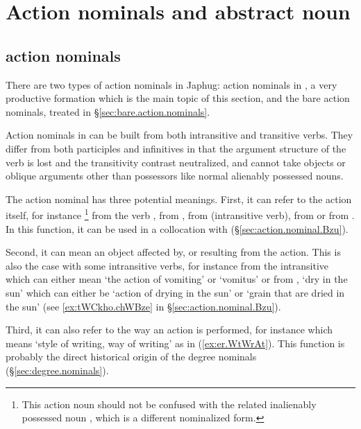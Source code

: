 \section{Action nominals and abstract noun} \label{sec:action.nominals}

\subsection{ action nominals} \label{sec:tW.action.nominal}
There are two types of action nominals in Japhug: action nominals in , a very productive formation which is the main topic of this section, and the bare action nominals, treated in §\ref{sec:bare.action.nominals}.

Action nominals in  can be built from both intransitive and transitive verbs. They differ from both participles and infinitives in that the argument structure of the verb is lost and the transitivity contrast neutralized, and cannot take objects or oblique arguments other than possessors like normal alienably possessed nouns.


The action nominal has three potential meanings.  First, it can refer to the action itself, for instance \footnote{This action noun should not be confused with the related inalienably possessed noun , which is a different nominalized form. } from the verb ,  from ,  from  (intransitive verb),  from  or  from . In this function, it can be used in a collocation with  (§\ref{sec:action.nominal.Bzu}).

Second, it can mean an object affected by, or resulting from the action. This is also the case with some intransitive verbs, for instance  from the intransitive  which can either mean `the action of vomiting' or `vomitus' or  from , `dry in the sun' which can either be `action of drying in the sun' or `grain that are dried in the sun' (see \ref{ex:tWCkho.chWBze} in §\ref{sec:action.nominal.Bzu}).

Third, it can also refer to the way an action is performed, for instance  which means `style of writing, way of writing' as in (\ref{ex:er.WtWrAt}). This function is probably the direct historical origin of the degree nominals (§\ref{sec:degree.nominals}).

